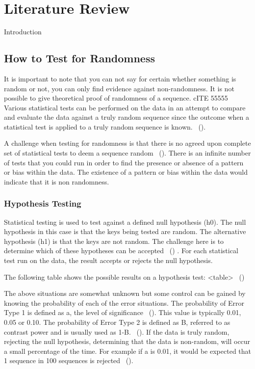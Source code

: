 \section{Literature Review}

Introduction

\subsection{How to Test for Randomness}

It is important to note that you can not say for certain whether something is random or not, you can only find evidence against non-randomness. It is not possible to give theoretical proof of randomness of a sequence. cITE 55555 Various statistical tests can be performed on the data in an attempt to compare and evaluate the data against a truly random sequence since the outcome when a statistical test is applied to a truly random sequence is known. ~(\cite{1195701}). \newline

A challenge when testing for randomness is that there is no agreed upon complete set of statistical tests to deem a sequence random ~(\cite{1195701}). There is an infinite number of tests that you could run in order to find the presence or absence of a pattern or bias within the data. The existence of a pattern or bias within the data would indicate that it is non randomness. \newline


\subsubsection{Hypothesis Testing}

Statistical testing is used to test against a defined null hypothesis (h0). The null hypothesis in this case is that the keys being tested are random. The alternative hypothesis (h1) is that the keys are not random. The challenge here is to determine which of these hypotheses can be accepted ~(\cite{10.1145/3447773}) . For each statistical test run on the data, the result accepts or rejects the null hypothesis. \newline

The following table shows the possible results on a hypothesis test:
 <table> ~(\cite{1195701}) \newline

The above situations are somewhat unknown but some control can be gained by knowing the probability of each of the error situations. The probability of Error Type 1 is defined as a, the level of significance ~(\cite{10.1145/3447773}). This value is typically 0.01, 0.05 or 0.10. The probability of Error Type 2 is defined as B, referred to as contrast power and is usually used as 1-B. ~(\cite{10.1145/3447773}). If the data is truly random, rejecting the null hypothesis, determining that the data is non-random, will occur a small percentage of the time. For example if a is 0.01, it would be expected that 1 sequence in 100 sequences is rejected ~(\cite{1195701}). \newline

